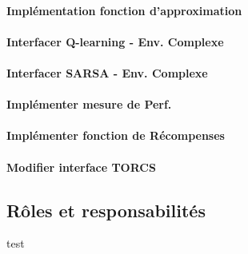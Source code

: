 \documentclass[a4paper,12pt]{article}
\begin{document}
      \paragraph{Implémentation fonction d'approximation}
      
      \paragraph{Interfacer Q-learning - Env. Complexe}
      
      \paragraph{Interfacer SARSA - Env. Complexe}
      
      \paragraph{Implémenter mesure de Perf.}
      
      \paragraph{Implémenter fonction de Récompenses}
      
      \paragraph{Modifier interface TORCS}
    
    \subsection{Rôles et responsabilités} test
	    
\end{document}
